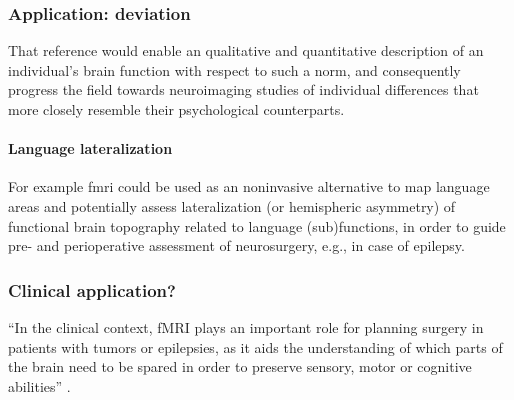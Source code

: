 \subsubsection{Application: deviation}



%
That reference would enable an qualitative and quantitative description of an
individual's brain function with respect to such a norm, and consequently
progress the field towards neuroimaging studies of individual differences that
more closely resemble their psychological counterparts.


\paragraph{Language lateralization}


%
For example \ac{fmri} could be used as an noninvasive alternative to map
language areas and potentially assess lateralization (or hemispheric asymmetry)
of functional brain topography related to language (sub)functions, in order to
guide pre- and perioperative assessment of neurosurgery, e.g., in case of
epilepsy.



\subsubsection{Clinical application?}




``In the clinical context, fMRI plays an important role for planning surgery in
patients with tumors or epilepsies, as it aids the understanding of which parts
of the brain need to be spared in order to preserve sensory, motor or cognitive
abilities'' \citep{wegrzyn2018thought}.


